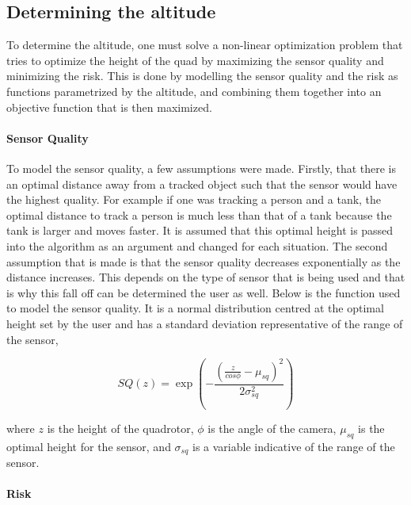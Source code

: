 \documentclass[12pt]{article}
\begin{document}
\subsection{Determining the altitude}

To determine the altitude, one must solve a non-linear optimization problem
that tries to optimize the height of the quad by maximizing the sensor quality
and minimizing the risk.  This is done by modelling the sensor quality and the
risk as functions parametrized by the altitude, and combining them together
into an objective function that is then maximized.

\paragraph{Sensor Quality}

To model the sensor quality, a few assumptions were made. Firstly, that there
is an optimal distance away from a tracked object such that the sensor would
have the highest quality. For example if one was tracking a person and a tank,
the optimal distance to track a person is much less than that of a tank because
the tank is larger and moves faster. It is assumed that this optimal height is
passed into the algorithm as an argument and changed for each situation. The
second assumption that is made is that the sensor quality decreases
exponentially as the distance increases. This depends on the type of sensor
that is being used and that is why this fall off can be determined the user as
well. Below is the function used to model the sensor quality. It is a normal
distribution centred at the optimal height set by the user and has a standard
deviation representative of the range of the sensor,

$$ SQ(z) = \exp{(-\frac{(\frac{z}{ cos{\phi}} -
\mu_{sq})^2}{2\sigma_{sq}^2})} $$

where $z$ is the height of the quadrotor, $\phi$ is the angle of the camera,
$\mu_{sq}$ is the optimal height for the sensor, and $\sigma_{sq}$ is a
variable indicative of the range of the sensor.

\paragraph{Risk} 
\end{document}
